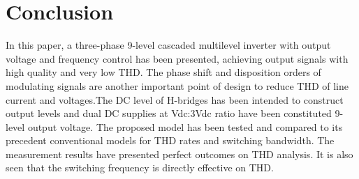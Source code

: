 
\chapter{Conclusion} %
\label{Chapter5}
In this paper, a three-phase 9-level cascaded multilevel
inverter with output voltage and frequency control has been
presented, achieving output signals with high quality and very
low THD. The phase shift and disposition orders of modulating signals are
another important point of design to reduce THD of line
current and voltages.The DC level of H-bridges has been intended to construct
output levels and dual DC supplies at Vdc:3Vdc ratio have
been constituted 9-level output voltage. The proposed model
has been tested and compared to its precedent conventional
models for THD rates and switching bandwidth. The
measurement results have presented perfect outcomes on
THD analysis. It is also seen that the switching frequency is directly effective
on THD.